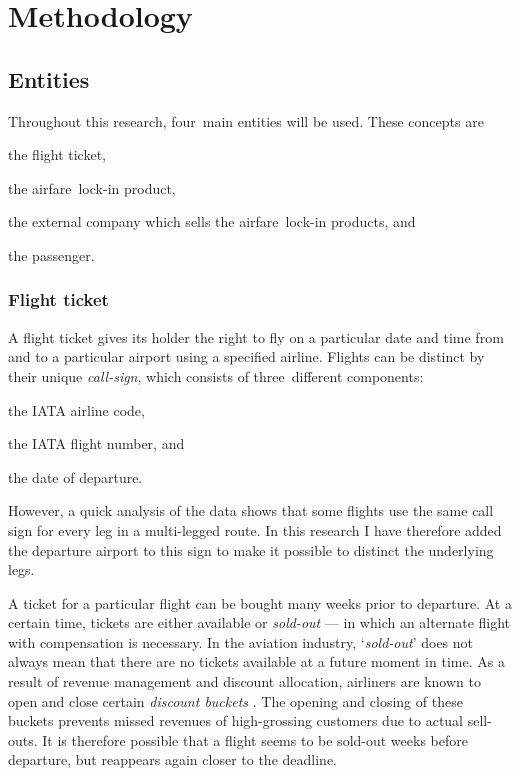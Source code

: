 \chapter{Methodology}
\label{chap:Methodology}
\section{Entities}
Throughout this research, four~main entities will be used. These concepts are \begin{inparaenum}
\item the flight ticket,
\item the airfare~lock-in product,
\item the external company which sells the airfare~lock-in products, and
\item the passenger.
\end{inparaenum}

\subsection{Flight ticket}
A flight ticket gives its holder the right to fly on a particular date and time from and to a particular airport using a specified airline. Flights can be distinct by their unique \emph{call-sign}, which consists of three~different components: \begin{inparaenum}
\item the IATA airline code,
\item the IATA flight number, and
\item the date of departure.
\end{inparaenum} However, a quick analysis of the data shows that some flights use the same call sign for every leg in a multi-legged route. In this research I have therefore added the departure airport to this sign to make it possible to distinct the underlying legs.

A ticket for a particular flight can be bought many weeks prior to departure. At a certain time, tickets are either available or \emph{sold-out} --- in which an alternate flight with compensation is necessary. In the aviation industry, `\emph{sold-out}' does not always mean that there are no tickets available at a future moment in time. As a result of revenue management and discount allocation, airliners are known to open and close certain \emph{discount buckets} \cite{mcgill1999revenue}. The opening and closing of these buckets prevents missed revenues of high-grossing customers due to actual sell-outs. It is therefore possible that a flight seems to be sold-out weeks before departure, but reappears again closer to the deadline.

